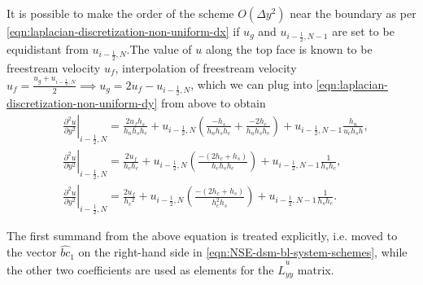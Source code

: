 \documentclass{article}
\numberwithin{equation}{section}
\begin{document}
It is possible to make the order of the scheme $O(\Delta y^2)$ near the boundary as per \cref{eqn:laplacian-discretization-non-uniform-dx} if $u_g$ and $u_{i-\frac{1}{2},N-1}$ are set to be equidistant from $u_{i-\frac{1}{2},N}$.The value of $u$ along the top face is known to be freestream velocity $u_{{f}}$, interpolation of freestream velocity $u_{f} = \frac{u_g+u_{i-\frac{1}{2},N}}{2}\implies u_g=2u_{f}-u_{i-\frac{1}{2},N}$, which we can plug into \cref{eqn:laplacian-discretization-non-uniform-dy} from above to obtain
\begin{equation}
\begin{aligned}
& \left.\frac{\partial ^2 u}{\partial y^2}\right|_{i-\frac{1}{2},N}=\frac{2 u_f h_s}{h_n h_s h_c}+u_{i-\frac{1}{2},N}\left(\frac{-h_s}{h_n h_s h_c}+\frac{-2 h_c}{h_n h_s h_c}\right)+u_{i-\frac{1}{2},N-1} \frac{h_n}{u_c h_s h},\\
& \left.\frac{\partial^2 u}{\partial y^2}\right|_{i-\frac{1}{2},N}=\frac{2 u_f}{h_c h_c}+u_{i-\frac{1}{2},N}\left(\frac{-\left(2 h_c+h_s\right)}{h_c h_s h_c}\right)+u_{i-\frac{1}{2},N-1} \frac{1}{h_s h_c}, \\
& \left.\frac{\partial^2 u}{\partial y^2}\right|_{i-\frac{1}{2},N}=\frac{2 u_f}{h_c{ }^2}+u_{i-\frac{1}{2},N}\left(\frac{-\left(2 h_c+h_s\right)}{h_c^2 h_s}\right)+u_{i-\frac{1}{2},N-1} \frac{1}{h_s h_c}.
\end{aligned}
\end{equation}

The first summand from the above equation is treated explicitly, i.e. moved to the vector $\hat{bc}_1$ on the right-hand side in \cref{eqn:NSE-dsm-bl-system-schemes}, while the other two coefficients are used as elements for the $\hat{L}^u_{yy}$ matrix.
\end{document}

